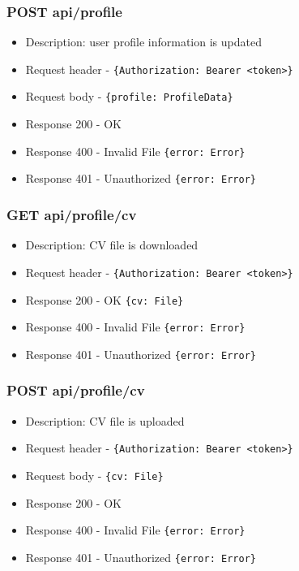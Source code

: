 \subsubsection{POST api/profile}
\begin{itemize}
    \item Description: user profile information is updated
    \item Request header - \verb|{Authorization: Bearer <token>}|
    \item Request body - \verb|{profile: ProfileData}|
    \item Response 200 - OK
    \item Response 400 - Invalid File \verb|{error: Error}|
    \item Response 401 - Unauthorized \verb|{error: Error}|
\end{itemize}

\subsubsection{GET api/profile/cv}
\begin{itemize}
    \item Description: CV file is downloaded
    \item Request header - \verb|{Authorization: Bearer <token>}|
    \item Response 200 - OK \verb|{cv: File}|
    \item Response 400 - Invalid File \verb|{error: Error}|
    \item Response 401 - Unauthorized \verb|{error: Error}|
\end{itemize}

\subsubsection{POST api/profile/cv}
\begin{itemize}
    \item Description: CV file is uploaded
    \item Request header - \verb|{Authorization: Bearer <token>}|
    \item Request body - \verb|{cv: File}|
    \item Response 200 - OK
    \item Response 400 - Invalid File \verb|{error: Error}|
    \item Response 401 - Unauthorized \verb|{error: Error}|
\end{itemize}

